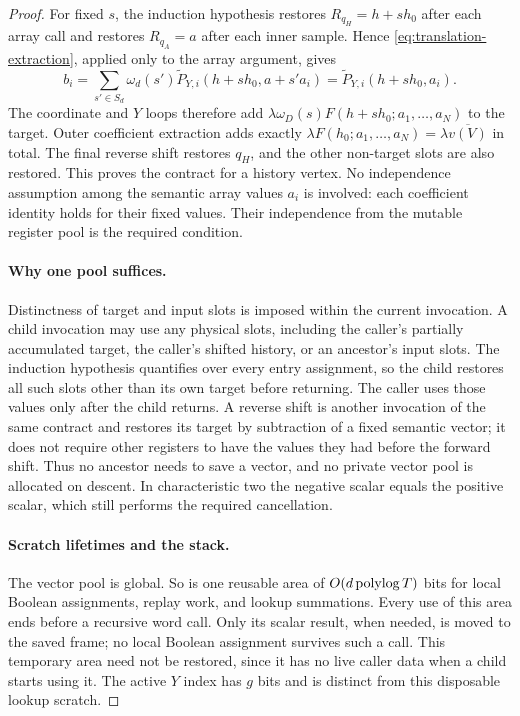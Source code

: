 \begin{proof}
For fixed $s$, the induction hypothesis restores $R_{q_H}=h+sh_0$ after
each array call and restores $R_{q_A}=a$ after each inner sample.  Hence
\eqref{eq:translation-extraction}, applied only to the array argument,
gives
\[
 b_i=\sum_{s'\in S_d}\omega_d(s')
       \widetilde P_{Y,i}(h+sh_0,a+s'a_i)
     =\widetilde P_{Y,i}(h+sh_0,a_i).
\]
The coordinate and $Y$ loops therefore add
$\lambda\omega_D(s)F(h+sh_0;a_1,\ldots,a_N)$ to the target.  Outer
coefficient extraction adds exactly
$\lambda F(h_0;a_1,\ldots,a_N)=\lambda\overline{v(V)}$ in total.
The final reverse shift restores $q_H$, and the other non-target slots are
also restored.  This proves the contract for a history vertex.  No
independence assumption among the semantic array values $a_i$ is involved:
each coefficient identity holds for their fixed values.  Their independence
from the mutable register pool is the required condition.

\paragraph{Why one pool suffices.}
Distinctness of target and input slots is imposed within the current
invocation.  A child invocation may use any physical slots, including the
caller's partially accumulated target, the caller's shifted history, or an
ancestor's input slots.  The induction hypothesis quantifies over every
entry assignment, so the child restores all such slots other than its own
target before returning.  The caller uses those values only after the child
returns.  A reverse shift is another invocation of the same contract and
restores its target by subtraction of a fixed semantic vector; it does not
require other registers to have the values they had before the forward
shift.  Thus no ancestor needs to save a vector, and no private vector pool
is allocated on descent.  In characteristic two the negative scalar equals
the positive scalar, which still performs the required cancellation.

\paragraph{Scratch lifetimes and the stack.}
The vector pool is global.  So is one reusable area of
$O(d\operatorname{polylog} T)$ bits for local Boolean assignments, replay work, and lookup
summations.  Every use of this area ends before a recursive word call.
Only its scalar result, when needed, is moved to the saved frame; no local
Boolean assignment survives such a call.  This temporary area need not be
restored, since it has no live caller data when a child starts using it.
The active $Y$ index has $g$ bits and is distinct from this disposable lookup
scratch.


\end{proof}
